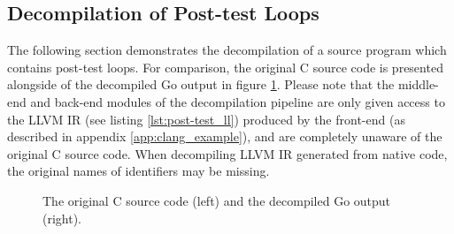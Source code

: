 
\subsection{Decompilation of Post-test Loops}

The following section demonstrates the decompilation of a source program which contains post-test loops. For comparison, the original C source code is presented alongside of the decompiled Go output in figure \ref{fig:post-test_comparison}. Please note that the middle-end and back-end modules of the decompilation pipeline are only given access to the LLVM IR (see listing \ref{lst:post-test_ll}) produced by the front-end (as described in appendix \ref{app:clang_example}), and are completely unaware of the original C source code. When decompiling LLVM IR generated from native code, the original names of identifiers may be missing.

\begin{figure}[htbp]
	\centering
	\begin{subfigure}[t]{0.49\textwidth}
		
	\end{subfigure}
	\qquad
	\begin{subfigure}[t]{0.31\textwidth}
		
	\end{subfigure}
	\caption{The original C source code (left) and the decompiled Go output (right).}
	\label{fig:post-test_comparison}
\end{figure}


